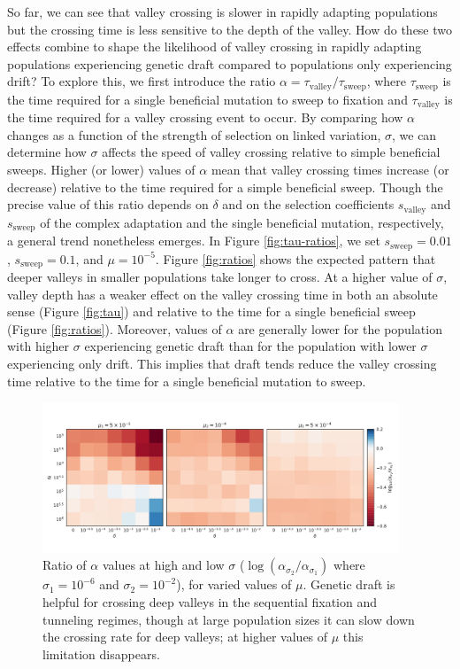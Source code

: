 \documentclass[10pt,twocolumn,twoside]{gsajnl}
\begin{document}
\begin{spacing}{1.5}
So far, we can see that valley crossing is slower in rapidly adapting populations but the crossing time is less sensitive to the depth of the valley.
How do these two effects combine to shape the likelihood of valley crossing in rapidly adapting populations experiencing genetic draft compared to populations only experiencing drift?
To explore this, we first introduce the ratio $\alpha = \tau_{\mathrm{valley}}/\tau_{\mathrm{sweep}}$, where $\tau_{\mathrm{sweep}}$ is the time required for a single beneficial mutation to sweep to fixation and $\tau_{\mathrm{valley}}$ is the time required for a valley crossing event to occur.
By comparing how $\alpha$ changes as a function of the strength of selection on linked variation, $\sigma$, we can determine how $\sigma$ affects the speed of valley crossing relative to simple beneficial sweeps. Higher (or lower) values of $\alpha$ mean that valley crossing times increase (or decrease) relative to the time required for a simple beneficial sweep.
Though the precise value of this ratio depends on $\delta$ and on the selection coefficients $s_{\mathrm{valley}}$ and $s_{\mathrm{sweep}}$ of the complex adaptation and the single beneficial mutation, respectively, a general trend nonetheless emerges.
In Figure \ref{fig:tau-ratios}, we set $s_{\mathrm{sweep}} = 0.01$, $s_{\mathrm{sweep}} = 0.1$, and $\mu = 10^{-5}$.
Figure \ref{fig:ratios} shows the expected pattern that deeper valleys in smaller populations take longer to cross.
At a higher value of $\sigma$, valley depth has a weaker effect on the valley crossing time in both an absolute sense (Figure \ref{fig:tau}) and relative to the time for a single beneficial sweep (Figure \ref{fig:ratios}).
Moreover, values of $\alpha$ are generally lower for the population with higher $\sigma$ experiencing genetic draft than for the population with lower $\sigma$ experiencing only drift.
This implies that draft tends reduce the valley crossing time relative to the time for a single beneficial mutation to sweep.

\begin{figure}[t]
\includegraphics[width=0.95\textwidth]{Figures/compare_ratios_multi.pdf}
\caption{Ratio of $\alpha$ values at high and low $\sigma$ ($\log \left( \alpha_{\sigma_2} / \alpha_{\sigma_1} \right)$ where $\sigma_1=10^{-6}$ and $\sigma_2=10^{-2}$), for varied values of $\mu$. Genetic draft is helpful for crossing deep valleys in the sequential fixation and tunneling regimes, though at large population sizes it can slow down the crossing rate for deep valleys; at higher values of $\mu$ this limitation disappears.}
\label{fig:alpha_ratio}
\end{figure}


\end{spacing}
\end{document}
